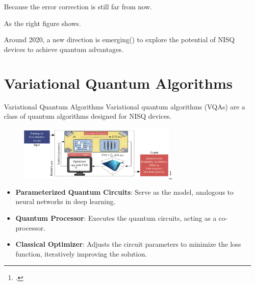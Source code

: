 \documentclass[10pt]{beamer}
\begin{document}
\begin{CJK}{UTF8}{gbsn}
{Because the error correction is still far from now.

As the right figure shows. 

Around 2020, a new direction is emerging() to explore the potential of NISQ devices to achieve quantum advantages. 
}


\section{Variational Quantum Algorithms}

\begin{frame}[fragile]{Variational Quantum Algorithms}
 Variational quantum algorithms (VQAs) are a class of quantum algorithms designed for NISQ devices. %
  \begin{figure}
    \centering
    \includegraphics[width=0.7\textwidth]{fig/vqa.png}\footcite{Cerezo2021variational}
  \end{figure}
  
  

  \begin{itemize}
    \item \textbf{Parameterized Quantum Circuits}: Serve as the model, analogous to neural networks in deep learning.
    \item \textbf{Quantum Processor}: Executes the quantum circuits, acting as a co-processor.
    \item \textbf{Classical Optimizer}: Adjusts the circuit parameters to minimize the loss function, iteratively improving the solution.
  \end{itemize}
  \vspace{1em}
\end{frame}
\end{CJK}
\end{document}
